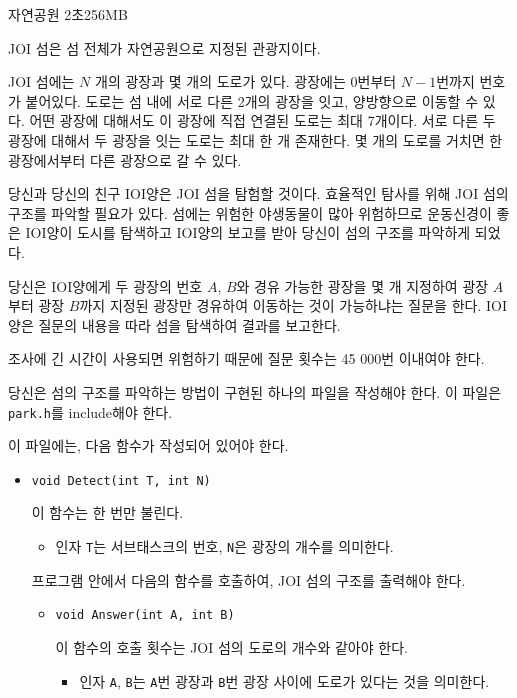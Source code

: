 \begin{problem}{자연공원}
	{}{}
	{2초}{256MB}{}
	
	JOI 섬은 섬 전체가 자연공원으로 지정된 관광지이다.
	
	JOI 섬에는 $N$ 개의 광장과 몇 개의 도로가 있다. 광장에는 0번부터 $N-1$번까지 번호가 붙어있다. 도로는 섬 내에 서로 다른 2개의 광장을 잇고, 양방향으로 이동할 수 있다. 어떤 광장에 대해서도 이 광장에 직접 연결된 도로는 최대 7개이다. 서로 다른 두 광장에 대해서 두 광장을 잇는 도로는 최대 한 개 존재한다. 몇 개의 도로를 거치면 한 광장에서부터 다른 광장으로 갈 수 있다.
	
	당신과 당신의 친구 IOI양은 JOI 섬을 탐험할 것이다. 효율적인 탐사를 위해 JOI 섬의 구조를 파악할 필요가 있다. 섬에는 위험한 야생동물이 많아 위험하므로 운동신경이 좋은 IOI양이 도시를 탐색하고 IOI양의 보고를 받아 당신이 섬의 구조를 파악하게 되었다.
	
	당신은 IOI양에게 두 광장의 번호 $A$, $B$와 경유 가능한 광장을 몇 개 지정하여 광장 $A$부터 광장 $B$까지 지정된 광장만 경유하여 이동하는 것이 가능하냐는 질문을 한다. IOI양은 질문의 내용을 따라 섬을 탐색하여 결과를 보고한다.
	
	조사에 긴 시간이 사용되면 위험하기 때문에 질문 횟수는 45 000번 이내여야 한다.
	
	\Specification
	
	당신은 섬의 구조를 파악하는 방법이 구현된 하나의 파일을 작성해야 한다. 이 파일은 \texttt{park.h}를 include해야 한다.
	
	이 파일에는, 다음 함수가 작성되어 있어야 한다.
	
	\begin{itemize}
		\item \texttt{void Detect(int T, int N)}
		
		이 함수는 한 번만 불린다.
		\begin{itemize}
			\item 인자 \texttt{T}는 서브태스크의 번호, \texttt{N}은 광장의 개수를 의미한다.
		\end{itemize}
		
		프로그램 안에서 다음의 함수를 호출하여, JOI 섬의 구조를 출력해야 한다.
		\begin{itemize}
			\item \texttt{void Answer(int A, int B)}
			
			이 함수의 호출 횟수는 JOI 섬의 도로의 개수와 같아야 한다.
			
			\begin{itemize}
				\item 인자 \texttt{A}, \texttt{B}는 \texttt{A}번 광장과 \texttt{B}번 광장 사이에 도로가 있다는 것을 의미한다.
			\end{itemize}
		

\end{itemize}
\end{itemize}
\end{problem}
